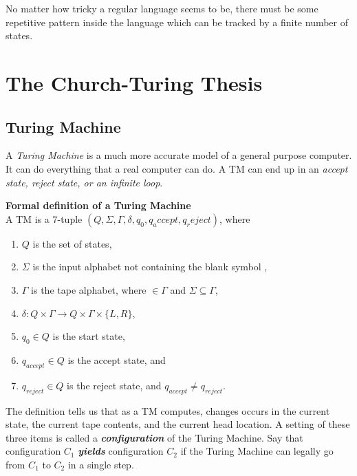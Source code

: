 \documentclass[11pt]{article}
\newcommand{\bemph}[1]{{\bfseries\itshape#1}}
\begin{document}
No matter how tricky a regular language seems to be, there must be
some repetitive pattern inside the language which can be tracked by a
finite number of states.

\section{The Church-Turing Thesis}

\subsection{Turing Machine}

A \emph{Turing Machine} is a much more accurate model of a general
purpose computer. It can do everything that a real computer can do. A
TM can end up in an \emph{accept state, reject state, or an infinite loop}.

\begin{mdframed}[backgroundcolor=yellow2] %
\textbf{Formal definition of a Turing Machine}\\

A TM is a 7-tuple $(Q, \Sigma, \Gamma, \delta, q_0, q_accept, q_reject)$, where
\begin{enumerate}
\item $Q$ is the set of states,
\item $\Sigma$ is the input alphabet not containing the blank
  symbol \textvisiblespace,
\item $\Gamma$ is the tape alphabet, where \textvisiblespace $\in 
  \Gamma$ and $\Sigma \subseteq \Gamma$,
\item $\delta: Q \times \Gamma \rightarrow Q \times \Gamma \times \{L, R\}$,
\item $q_0 \in Q$ is the start state,
\item $q_{accept} \in Q$ is the accept state, and
\item $q_{reject} \in Q$ is the reject state, and $q_{accept} \neq q_{reject}$.

\end{enumerate}
\end{mdframed}

The definition tells us that as a TM computes, changes occurs in the
current state, the current tape contents, and the current head
location. A setting of these three items is called a
\textit{\textbf{configuration}} of the Turing Machine. Say that
configuration $C_1$ \bemph{yields} configuration $C_2$ if the Turing
Machine can legally go from $C_1$ to $C_2$ in a single step.\\
\end{document}
